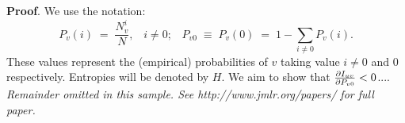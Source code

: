 	\noindent
	{\bf Proof}. We use the notation:
	\[
	P_v(i) \;=\;\frac{N_v^i}{N},\;\;\;i \neq 0;\;\;\;
	P_{v0}\;\equiv\;P_v(0)\; = \;1 - \sum_{i\neq 0}P_v(i).
	\]
	These values represent the (empirical) probabilities of $v$
	taking value $i\neq 0$ and 0 respectively.  Entropies will be denoted
	by $H$. We aim to show that $\frac{\partial I_{uv}}{\partial P_{v0}} < 0$....\\
	
	{\noindent \em Remainder omitted in this sample. See http://www.jmlr.org/papers/ for full paper.}
	
	
	\vskip 0.2in
	
	
